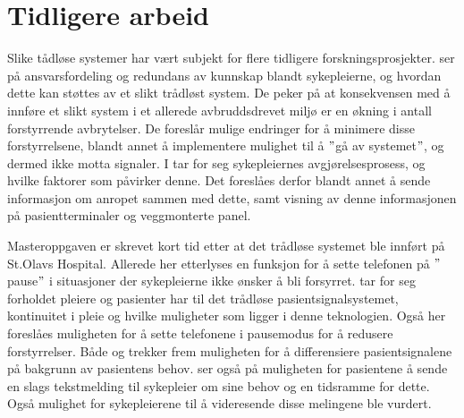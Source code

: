 \section{Tidligere arbeid}
Slike tådløse systemer har vært subjekt for flere tidligere forskningsprosjekter. \citet{KlemetsRedundancy} ser på ansvarsfordeling og redundans av kunnskap blandt sykepleierne, og hvordan dette kan støttes av et slikt trådløst system. De peker på at konsekvensen med å innføre et slikt system i et allerede avbruddsdrevet miljø er en økning i antall forstyrrende avbrytelser. De foreslår mulige endringer for å minimere disse forstyrrelsene, blandt annet å implementere mulighet til å $"$gå av systemet$"$, og dermed ikke motta signaler. I \citep{klemets13} tar for seg sykepleiernes avgjørelsesprosess, og hvilke faktorer som påvirker denne. Det foreslåes derfor blandt annet å sende informasjon om anropet sammen med dette, samt visning av denne informasjonen på pasientterminaler og veggmonterte panel.

\noindent
Masteroppgaven \citep{Sletten09} er skrevet kort tid etter at det trådløse systemet ble innført på St.Olavs Hospital. Allerede her etterlyses en funksjon for å sette telefonen på $"$pause$"$ i situasjoner der sykepleierne ikke ønsker å bli forsyrret.
\citet{Rygh13} tar for seg forholdet pleiere og pasienter har til det trådløse pasientsignalsystemet, kontinuitet i pleie og hvilke muligheter som ligger i denne teknologien. Også her foreslåes muligheten for å sette telefonene i pausemodus for å redusere forstyrrelser. Både \citep{Rygh13} og \citep{Selseth12} trekker frem muligheten for å differensiere pasientsignalene på bakgrunn av pasientens behov. \citet{Selseth12} ser også på muligheten for pasientene å sende en slags tekstmelding til sykepleier om sine behov og en tidsramme for dette. Også mulighet for sykepleierene til å videresende disse melingene ble vurdert. 


